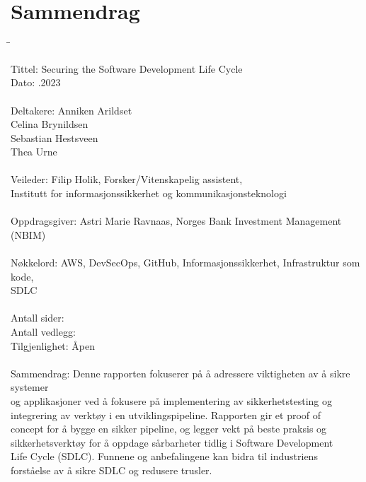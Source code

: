 \chapter*{Sammendrag}
{ %
\begin{tabbing}
\hspace{2cm}\=\hspace{1.5cm}\=\kill %

Tittel: \> \> Securing the Software Development Life Cycle \\
Dato: \> .2023 \\ 
\\
Deltakere: \> \> Anniken Arildset \\ \> \> Celina Brynildsen \\ \> \> Sebastian Hestsveen \\ \> \> Thea Urne \\
\\
Veileder: \> \> Filip Holik, Forsker/Vitenskapelig assistent, \\\> \> Institutt for informasjonssikkerhet og kommunikasjonsteknologi \\
\\
Oppdragsgiver: \> \>  Astri Marie Ravnaas, Norges Bank Investment Management (NBIM) \\
\\
Nøkkelord: \> \> AWS, DevSecOps, GitHub, Informasjonssikkerhet, Infrastruktur som kode,\\\> \> SDLC \\
\\
Antall sider: \>  \\
Antall vedlegg: \>  \\
Tilgjenlighet: \> \> Åpen \\
\\
Sammendrag: \> \>Denne rapporten fokuserer på å adressere viktigheten av å sikre systemer \\\> \>og applikasjoner ved å fokusere på implementering av sikkerhetstesting og\\\> \> integrering av verktøy i en utviklingspipeline. Rapporten gir et proof of \\\> \>concept for å bygge en sikker pipeline, og legger vekt på beste praksis og \\\> \>sikkerhetsverktøy for å oppdage sårbarheter tidlig i Software Development\\\> \> Life Cycle (SDLC). Funnene og anbefalingene kan bidra til industriens\\\> \> forståelse av å sikre SDLC og redusere trusler.
\end{tabbing}
}



